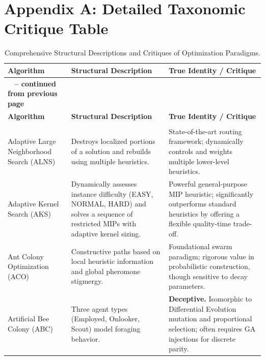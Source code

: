 \section{Appendix A: Detailed Taxonomic Critique Table}
\label{appendix:taxonomy}

\begin{center}
\small
\renewcommand{\arraystretch}{1.5}
\begin{longtable}{
  >{\raggedright\arraybackslash}p{}
  >{\raggedright\arraybackslash}p{}
  >{\raggedright\arraybackslash}p{}
}
\caption{Comprehensive Structural Descriptions and Critiques of Optimization Paradigms.} \label{tab:appendix_taxonomy} \\
\toprule
\textbf{Algorithm} & \textbf{Structural Description} & \textbf{True Identity / Critique} \\
\midrule
\endfirsthead

\multicolumn{3}{c}%
{{\bfseries \tablename\ \thetable{} -- continued from previous page}} \\
\toprule
\textbf{Algorithm} & \textbf{Structural Description} & \textbf{True Identity / Critique} \\
\midrule
\endhead

\midrule \multicolumn{3}{r}{{Continued on next page}} \\
\endfoot

\bottomrule
\endlastfoot

Adaptive Large Neighborhood Search (ALNS) & Destroys localized portions of a solution and rebuilds using multiple heuristics. & State-of-the-art routing framework; dynamically controls and weights multiple lower-level heuristics. \\ \midrule

Adaptive Kernel Search (AKS) & Dynamically assesses instance difficulty (EASY, NORMAL, HARD) and solves a sequence of restricted MIPs with adaptive kernel sizing. & Powerful general-purpose MIP heuristic; significantly outperforms standard heuristics by offering a flexible quality-time trade-off. \\ \midrule

Ant Colony Optimization (ACO) & Constructive paths based on local heuristic information and global pheromone stigmergy. & Foundational swarm paradigm; rigorous value in probabilistic construction, though sensitive to decay parameters. \\ \midrule

Artificial Bee Colony (ABC) & Three agent types (Employed, Onlooker, Scout) model foraging behavior. & \textbf{Deceptive.} Isomorphic to Differential Evolution mutation and proportional selection; often requires GA injections for discrete parity. \\ \midrule


\end{longtable}
\end{center}
